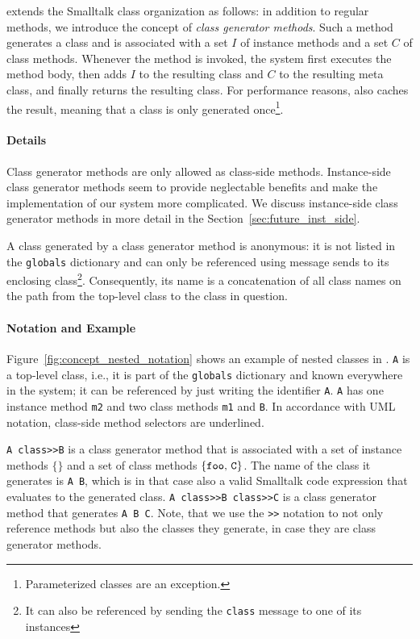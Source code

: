 \msname extends the Smalltalk class organization as follows: in addition to regular methods, we introduce the concept of \emph{class generator methods}. Such a method generates a class and is associated with a set $I$ of instance methods and a set $C$ of class methods. Whenever the method is invoked, the system first executes the method body, then adds $I$ to the resulting class and $C$ to the resulting meta class, and finally returns the resulting class. For performance reasons, \msname also caches the result, meaning that a class is only generated once\footnote{Parameterized classes are an exception.}.

\paragraph{Details}
Class generator methods are only allowed as class-side methods. Instance-side class generator methods seem to provide neglectable benefits and make the implementation of our system more complicated. We discuss instance-side class generator methods in more detail in the Section~\ref{sec:future_inst_side}.

A class generated by a class generator method is anonymous: it is not listed in the \texttt{globals} dictionary and can only be referenced using message sends to its enclosing class\footnote{It can also be referenced by sending the \texttt{class} message to one of its instances}. Consequently, its name is a concatenation of all class names on the path from the top-level class to the class in question.


\paragraph{Notation and Example}
Figure~\ref{fig:concept_nested_notation} shows an example of nested classes in \msname. \texttt{A} is a top-level class, i.e., it is part of the \texttt{globals} dictionary and known everywhere in the system; it can be referenced by just writing the identifier \texttt{A}. \texttt{A} has one instance method \texttt{m2} and two class methods \texttt{m1} and \texttt{B}. In accordance with UML notation, class-side method selectors are underlined. 

\texttt{A class>>B} is a class generator method that is associated with a set of instance methods $\{\}$ and a set of class methods $\{\mbox{\texttt{foo}, \texttt{C}}\}$. The name of the class it generates is \texttt{A B}, which is in that case also a valid Smalltalk code expression that evaluates to the generated class. \texttt{A class>>B class>>C} is a class generator method that generates \texttt{A B C}. Note, that we use the \texttt{>>} notation to not only reference methods but also the classes they generate, in case they are class generator methods.

